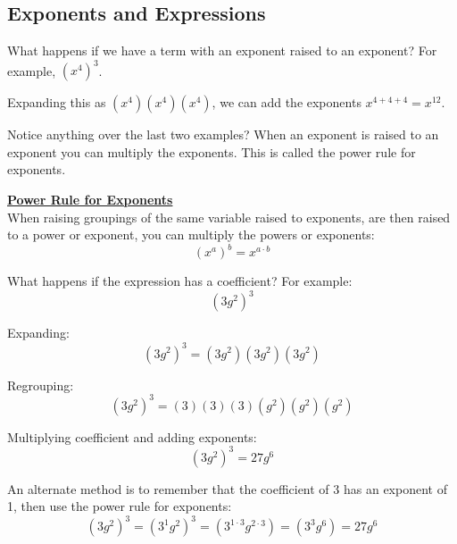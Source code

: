 \subsection{Exponents and Expressions}

What happens if we have a term with an exponent raised to an exponent? For example, $(x^4)^3$.

Expanding this as $(x^4)(x^4)(x^4)$, we can add the exponents $x^{4+4+4} = x^{12}$.



Notice anything over the last two examples? When an exponent is raised to an exponent you can multiply the exponents. This is called the power rule for exponents.

\begin{definition}
	\textbf{\underline{Power Rule for Exponents}}\\
	\bigskip
	When raising groupings of the same variable raised to exponents, are then raised to a power or exponent, you can multiply the powers or exponents:
	$$\displaystyle {(x^a)}^b=x^{a \cdot b}$$
\end{definition}



What happens if the expression has a coefficient? For example:
$${(3g^2)}^3$$

Expanding:
$${(3g^2)}^3=(3g^2)(3g^2)(3g^2)$$

Regrouping:
$${(3g^2)}^3=(3)(3)(3)(g^2)(g^2)(g^2)$$

Multiplying coefficient and adding exponents:
$${(3g^2)}^3=27g^6$$

An alternate method is to remember that the coefficient of 3 has an exponent of 1, then use the power rule for exponents:
$${(3g^2)}^3={(3^1g^2)}^3=(3^{1\cdot 3}g^{2\cdot 3})=(3^{3}g^{6})=27g^6$$


